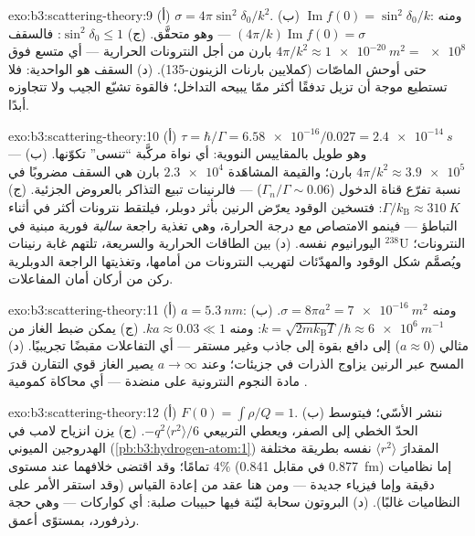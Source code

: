 \begin{solution}{exo:b3:scattering-theory:9}
(أ) $\sigma = 4\pi\sin^2\delta_0/k^2$. (ب) $\operatorname{Im}f(0)
= \sin^2\delta_0/k$: ومنه $(4\pi/k)\operatorname{Im}f(0) = \sigma$ ---
وهو متحقَّق. (ج) $\sin^2\delta_0 \le 1$: فالسقف $4\pi/k^2 \approx
\qty{1e-20}{m^2} = \num{e8}$ بارن من أجل النترونات الحرارية ---
أي متسع فوق حتى أوحش الماصّات (كملايين بارنات
الزينون-135). (د) السقف هو الواحدية: فلا تستطيع موجة أن
تزيل تدفقًا أكثر ممّا يبيحه التداخل؛ فالقوة تشبّع
الجيب ولا تتجاوزه أبدًا.
\end{solution}

\begin{solution}{exo:b3:scattering-theory:10}
(أ) $\tau = \hbar/\Gamma = \num{6.58e-16}/0.027 =
\qty{2.4e-14}{s}$ --- وهو طويل بالمقاييس النووية: أي نواة
مركَّبة ``تنسى'' تكوّنها. (ب) $4\pi/k^2 \approx
\num{3.9e5}$ بارن؛ والقيمة المشاهَدة $\num{2.3e4}$ بارن هي السقف مضروبًا
في نسبة تفرّع قناة الدخول ($\Gamma_n/\Gamma
\sim 0.06$) --- فالرنينات تبيع التذاكر بالعروض الجزئية. (ج)
$\Gamma/k_{\text{B}} \approx \qty{310}{K}$: فتسخين الوقود
يعرّض الرنين بأثر دوبلر، فيلتقط نترونات أكثر في أثناء
التباطؤ --- فينمو الامتصاص مع درجة الحرارة، وهي تغذية راجعة
\emph{سالبة} فورية مبنية في اليورانيوم نفسه. (د) بين
الطاقات الحرارية والسريعة، تلتهم غابة رنينات $^{238}$U
النترونات؛ ويُصمَّم شكل الوقود والمهدّئات لتهريب النترونات
من أمامها، وتغذيتها الراجعة الدوبلرية ركن من أركان أمان
المفاعلات.
\end{solution}

\begin{solution}{exo:b3:scattering-theory:11}
(أ) $a = \qty{5.3}{nm}$: ومنه $\sigma = 8\pi a^2 = \qty{7e-16}{m^2}$.
(ب) $k = \sqrt{2mk_{\text{B}}T}/\hbar \approx \qty{6e6}{m^{-1}}$:
ومنه $ka \approx 0.03 \ll 1$. (ج) يمكن ضبط الغاز من مثالي
($a \approx 0$) إلى دافع بقوة إلى جاذب وغير
مستقر --- أي التفاعلات مقبضًا تجريبيًا. (د) المسح
عبر الرنين يزاوج الذرات في جزيئات؛ وعند $a \to
\infty$ يصير الغاز قوي التقارن قدرَ مادة النجوم
النترونية على منضدة --- أي محاكاة كمومية .
\end{solution}

\begin{solution}{exo:b3:scattering-theory:12}
(أ) $F(0) = \int\rho/Q = 1$. (ب) ننشر الأسّي؛ فيتوسط الحدّ
الخطي إلى الصفر، ويعطي التربيعي
$-q^2\langle r^2\rangle/6$. (ج) يزن انزياح لامب في الهدروجين
الميوني (\cref{pb:b3:hydrogen-atom:1}) المقدارَ
$\langle r^2\rangle$ نفسه بطريقة مختلفة تمامًا؛ وقد اقتضى
خلافهما عند مستوى $4\%$ (0.877 في مقابل \qty{0.841}{fm})
إما نظاميات دقيقة وإما فيزياء جديدة --- ومن هنا
عقد من إعادة القياس (وقد استقر الأمر على النظاميات غالبًا).
(د) البروتون سحابة ليّنة فيها حبيبات صلبة: أي كواركات
--- وهي حجة رذرفورد، بمستوًى أعمق.
\end{solution}

